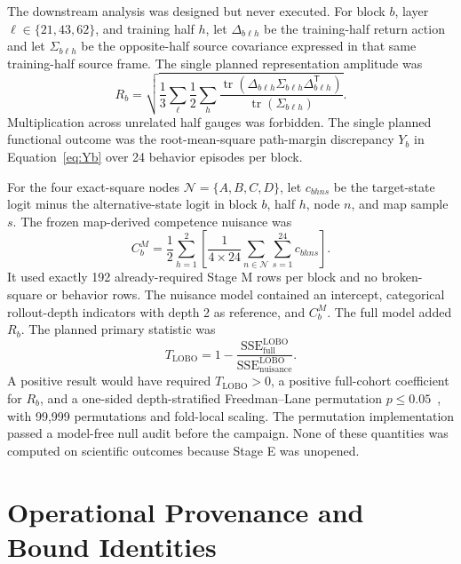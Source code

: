 \documentclass[10pt,a4paper]{article}
\begin{document}
The downstream analysis was designed but never executed. For block $b$, layer $\ell\in\{21,43,62\}$, and training half $h$, let $\Delta_{b\ell h}$ be the training-half return action and let $\Sigma_{b\ell h}$ be the opposite-half source covariance expressed in that same training-half source frame. The single planned representation amplitude was
\begin{equation}
 R_b=\sqrt{\frac{1}{3}\sum_{\ell}\frac{1}{2}\sum_h
 \frac{\operatorname{tr}(\Delta_{b\ell h}\Sigma_{b\ell h}\Delta_{b\ell h}^{\mathsf T})}
 {\operatorname{tr}(\Sigma_{b\ell h})}}.
 \label{eq:Rb}
\end{equation}
Multiplication across unrelated half gauges was forbidden. The single planned functional outcome was the root-mean-square path-margin discrepancy $Y_b$ in Equation~\eqref{eq:Yb} over 24 behavior episodes per block.

For the four exact-square nodes $\mathcal N=\{A,B,C,D\}$, let $c_{bhns}$ be the target-state logit minus the alternative-state logit in block $b$, half $h$, node $n$, and map sample $s$. The frozen map-derived competence nuisance was
\begin{equation}
 C_b^M=\frac{1}{2}\sum_{h=1}^{2}\left[
 \frac{1}{4\times24}\sum_{n\in\mathcal N}\sum_{s=1}^{24}c_{bhns}
 \right].
 \label{eq:map-competence}
\end{equation}
It used exactly 192 already-required Stage M rows per block and no broken-square or behavior rows. The nuisance model contained an intercept, categorical rollout-depth indicators with depth 2 as reference, and $C_b^M$. The full model added $R_b$. The planned primary statistic was
\begin{equation}
 T_{\mathrm{LOBO}}=1-\frac{\mathrm{SSE}^{\mathrm{LOBO}}_{\mathrm{full}}}
 {\mathrm{SSE}^{\mathrm{LOBO}}_{\mathrm{nuisance}}}.
\end{equation}
A positive result would have required $T_{\mathrm{LOBO}}>0$, a positive full-cohort coefficient for $R_b$, and a one-sided depth-stratified Freedman--Lane permutation $p\leq0.05$~\cite{freedmanlane1983}, with 99,999 permutations and fold-local scaling. The permutation implementation passed a model-free null audit before the campaign. None of these quantities was computed on scientific outcomes because Stage E was unopened.

\section{Operational Provenance and Bound Identities}
\label{app:provenance}
\end{document}
